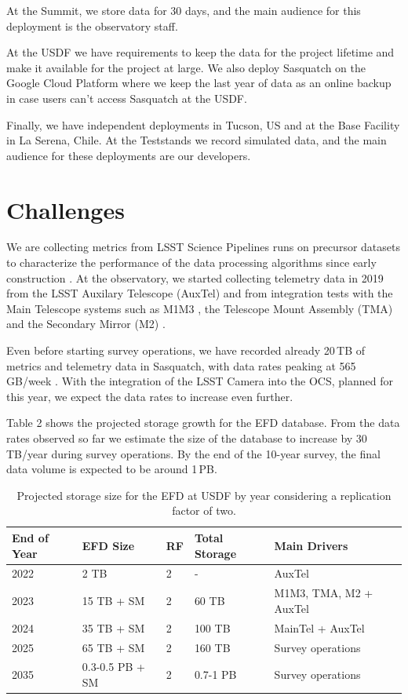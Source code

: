 At the Summit, we store data for 30 days, and the main audience for this deployment is the observatory staff.

At the USDF we have requirements to keep the data for the project lifetime and make it available for the project at large. We also deploy Sasquatch on the Google Cloud Platform where we keep the last year of data as an online backup in case users can't access Sasquatch at the USDF.

Finally, we have independent deployments in Tucson, US and at the Base Facility in La Serena, Chile. At the Teststands we record simulated data, and the main audience for these deployments are our developers.

\section{Challenges}
\label{sec:challenges}

We are collecting metrics from LSST Science Pipelines runs on precursor datasets to characterize the performance of the data processing algorithms since early construction \cite{DMTN-091,2022SPIE12189E..0MG}. At the observatory, we started collecting telemetry data in 2019 from the LSST Auxilary Telescope (AuxTel) and from integration tests with the Main Telescope systems such as M1M3 \cite{SITCOMTN-088}, the Telescope Mount Assembly (TMA) \cite{SITCOMTN-121} and the Secondary Mirror (M2) \cite{SITCOMTN-120}.

Even before starting survey operations, we have recorded already 20\,TB of metrics and telemetry data in Sasquatch, with data rates peaking at 565\,GB/week \cite{SQR-085}. With the integration of the LSST Camera into the OCS, planned for this year, we expect the data rates to increase even further.

Table 2 shows the projected storage growth for the EFD database. From the data rates observed so far we estimate the size of the database to increase by 30\,TB/year during survey operations. By the end of the 10-year survey, the final data volume is expected to be around 1\,PB.

\begin{table}[ht]
    \centering
    \caption{Projected storage size for the EFD at USDF by year considering a replication factor of two.}
    \begin{tabular}{@{}lllll@{}}
        \toprule
        \textbf{End of Year} & \textbf{EFD Size} & \textbf{RF} & \textbf{Total Storage} & \textbf{Main Drivers} \\
        \midrule
        2022 & 2 TB & 2 & - & AuxTel \\
        2023 & 15 TB + SM & 2 & 60 TB & M1M3, TMA, M2 + AuxTel \\
        2024 & 35 TB + SM & 2 & 100 TB & MainTel + AuxTel \\
        2025 & 65 TB + SM & 2 & 160 TB & Survey operations \\
        2035 & 0.3-0.5 PB + SM & 2 & 0.7-1 PB & Survey operations \\
        \bottomrule
    \end{tabular}
\end{table}

